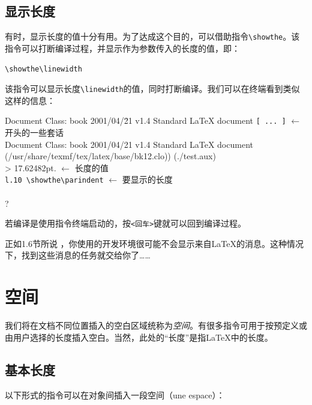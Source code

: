 \subsection{显示长度}

有时，显示长度的值十分有用。为了达成这个目的，可以借助指令\verb|\showthe|。该指令可以打断编译过程，并显示作为参数传入的长度的值，即：

\begin{dmd}
\verb|\showthe\linewidth|
\end{dmd}

该指令可以显示长度\verb|\linewidth|的值，同时打断编译。我们可以在终端看到类似这样的信息：

\begin{dmd}
\begin{tabbing}
Document Class: book 2001/04/\= 21 v1.4 Standard LaTeX document\kill
\verb|[ ... ]| \> $\leftarrow$ \textsf{开头的一些套话}\\
Document Class: book 2001/04/21 v1.4 Standard LaTeX document\\
(/usr/share/texmf/tex/latex/base/bk12.clo)) (./test.aux)\\
> 17.62482pt. \> $\leftarrow$ \textsf{长度的值}\\
\verb|l.10 \showthe\parindent| \> $\leftarrow$ \textsf{要显示的长度}\\
~\\
?
\end{tabbing}
\end{dmd}

若编译是使用指令终端启动的，按\verb|<回车>|键就可以回到编译过程。

\begin{ii}
正如1.6节所说%
，你使用的开发环境很可能不会显示来自\LaTeX 的消息。这种情况下，找到这些消息的任务就交给你了……
\end{ii}


\section{空间}

我们将在文档不同位置插入的空白区域统称为\emph{空间}。有很多指令可用于按预定义或由用户选择的长度插入空白。当然，此处的``长度''是指\LaTeX 中的长度。

\subsection{基本长度}

以下形式的指令可以在对象间插入一段空间（une espace）：

